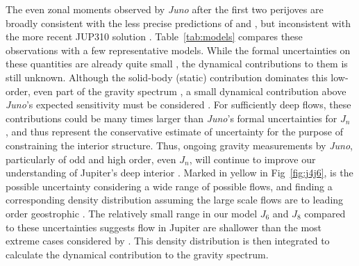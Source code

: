 The even zonal moments observed by \textit{Juno} after the first two perijoves
\citep{Folkner2017} are broadly consistent with the less precise predictions of
\citet{Campbell1985} and \citet{jacobson2003}, but inconsistent with the more
recent JUP310 solution \citep{Jacobson2013}.  Table~\ref{tab:models} compares
these observations with a few representative models. 
While the formal
uncertainties on these quantities are already quite small \citep{Folkner2017}, the dynamical
contributions to them is still unknown. 
Although the solid-body (static) contribution dominates this low-order, even
part of the gravity spectrum \citep{Hubbard1999}, a small dynamical
contribution above \textit{Juno}'s expected sensitivity must be considered
\citep{kaspi2010}.  For sufficiently deep flows, these contributions could be
many times larger than \textit{Juno}'s formal uncertainties for $J_n$
\citep{Kaspi2017}, and thus represent the conservative estimate of uncertainty
for the purpose of constraining the interior structure. Thus, ongoing gravity
measurements by \textit{Juno}, particularly of odd and high order, even $J_n$,
will continue to improve our understanding of Jupiter's deep interior
\citep{kaspi2013}.  Marked in yellow in Fig~\ref{fig:j4j6}, is the possible
uncertainty considering a wide range of possible flows, and finding a
corresponding density distribution assuming the large scale flows are to
leading order geostrophic \citep{Kaspi2009}.  The relatively small range in our
model $J_6$ and $J_8$ compared to these uncertainties suggests flow in Jupiter
are shallower than the most extreme cases considered by \citet{Kaspi2017}. 
This density
distribution is then integrated to calculate the dynamical contribution to the
gravity spectrum.

